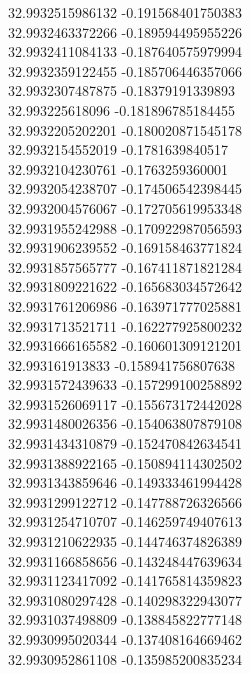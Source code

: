 {32.9932515986132	-0.191568401750383\\
32.9932463372266	-0.189594495955226\\
32.9932411084133	-0.187640575979994\\
32.9932359122455	-0.185706446357066\\
32.9932307487875	-0.18379191339893\\
32.993225618096	-0.181896785184455\\
32.9932205202201	-0.180020871545178\\
32.9932154552019	-0.1781639840517\\
32.9932104230761	-0.1763259360001\\
32.9932054238707	-0.174506542398445\\
32.9932004576067	-0.172705619953348\\
32.9931955242988	-0.170922987056593\\
32.9931906239552	-0.169158463771824\\
32.9931857565777	-0.167411871821284\\
32.9931809221622	-0.165683034572642\\
32.9931761206986	-0.163971777025881\\
32.9931713521711	-0.162277925800232\\
32.9931666165582	-0.160601309121201\\
32.993161913833	-0.158941756807638\\
32.9931572439633	-0.157299100258892\\
32.9931526069117	-0.155673172442028\\
32.9931480026356	-0.154063807879108\\
32.9931434310879	-0.152470842634541\\
32.9931388922165	-0.150894114302502\\
32.9931343859646	-0.149333461994428\\
32.9931299122712	-0.147788726326566\\
32.9931254710707	-0.146259749407613\\
32.9931210622935	-0.144746374826389\\
32.9931166858656	-0.143248447639634\\
32.9931123417092	-0.141765814359823\\
32.9931080297428	-0.140298322943077\\
32.9931037498809	-0.138845822777148\\
32.9930995020344	-0.137408164669462\\
32.9930952861108	-0.135985200835234\\
}
